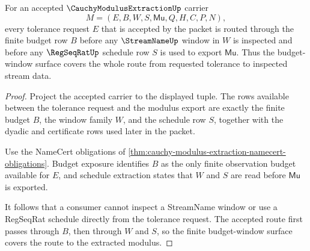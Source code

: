 \begin{theorem}
\label{thm:cauchy-modulus-extraction-budget-window-coverage}
For an accepted $\CauchyModulusExtractionUp$ carrier
$$
M=(E,B,W,S,\mathsf{Mu},Q,H,C,P,N),
$$
every tolerance request $E$ that is accepted by the packet is routed through the finite budget row $B$ before any $\StreamNameUp$ window in $W$ is inspected and before any $\RegSeqRatUp$ schedule row $S$ is used to export $\mathsf{Mu}$. Thus the budget-window surface covers the whole route from requested tolerance to inspected stream data.
\end{theorem}
\begin{proof}
Project the accepted carrier to the displayed tuple. The rows available between the tolerance request and the modulus export are exactly the finite budget $B$, the window family $W$, and the schedule row $S$, together with the dyadic and certificate rows used later in the packet.

Use the NameCert obligations of \autoref{thm:cauchy-modulus-extraction-namecert-obligations}. Budget exposure identifies $B$ as the only finite observation budget available for $E$, and schedule extraction states that $W$ and $S$ are read before $\mathsf{Mu}$ is exported.

It follows that a consumer cannot inspect a StreamName window or use a RegSeqRat schedule directly from the tolerance request. The accepted route first passes through $B$, then through $W$ and $S$, so the finite budget-window surface covers the route to the extracted modulus.
\end{proof}


